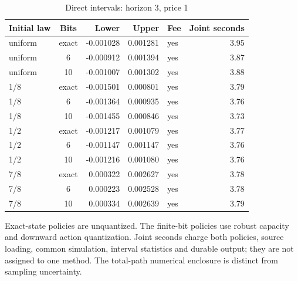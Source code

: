 \begin{table}[htbp]
\centering
\caption{Direct intervals: horizon 3, price 1}\label{tab:direct-full48-3-1}
\footnotesize
\begin{tabular}{lcrrlr}
\toprule
Initial law & Bits & Lower & Upper & Fee & Joint seconds\\
\midrule
uniform & exact & -0.001028 & 0.001281 & yes & 3.95 \\
uniform & 6 & -0.000912 & 0.001394 & yes & 3.87 \\
uniform & 10 & -0.001007 & 0.001302 & yes & 3.88 \\
1/8 & exact & -0.001501 & 0.000801 & yes & 3.79 \\
1/8 & 6 & -0.001364 & 0.000935 & yes & 3.76 \\
1/8 & 10 & -0.001455 & 0.000846 & yes & 3.73 \\
1/2 & exact & -0.001217 & 0.001079 & yes & 3.77 \\
1/2 & 6 & -0.001147 & 0.001147 & yes & 3.76 \\
1/2 & 10 & -0.001216 & 0.001080 & yes & 3.76 \\
7/8 & exact & 0.000322 & 0.002627 & yes & 3.78 \\
7/8 & 6 & 0.000223 & 0.002528 & yes & 3.78 \\
7/8 & 10 & 0.000334 & 0.002639 & yes & 3.79 \\
\bottomrule
\end{tabular}
\begin{minipage}{0.97\linewidth}\footnotesize\vspace{3pt}
Exact-state policies are unquantized. The finite-bit policies use robust capacity and downward action quantization. Joint seconds charge both policies, source loading, common simulation, interval statistics and durable output; they are not assigned to one method. The total-path numerical enclosure is distinct from sampling uncertainty.
\end{minipage}
\end{table}
